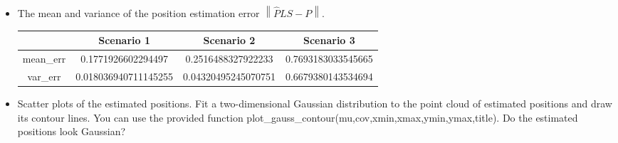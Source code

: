 \documentclass[a4paper]{article}
\newcommand\norm[1]{\left\lVert#1\right\rVert}
\begin{document}
\begin{itemize}
\begin{itemize}
\item The mean and variance of the position estimation error $\norm{\hat{P}LS -P}$.

\begin{center}
\begin{tabular}{|c|c|c|c|} 
\hline
 &Scenario 1 &Scenario 2 &Scenario 3 \\
\hline
mean\_err &0.1771926602294497 &0.2516488327922233 &0.7693183033545665 \\
\hline
var\_err &0.018036940711145255 &0.04320495245070751 &0.6679380143534694 \\
\hline
\end{tabular}
\end{center}

\newpage

\item Scatter plots of the estimated positions. Fit a two-dimensional Gaussian distribution to the point cloud of estimated positions and draw its contour lines. You can use the provided function plot\_gauss\_contour(mu,cov,xmin,xmax,ymin,ymax,title). Do the estimated positions look Gaussian?
  

\end{itemize}
\end{itemize}
\end{document}
